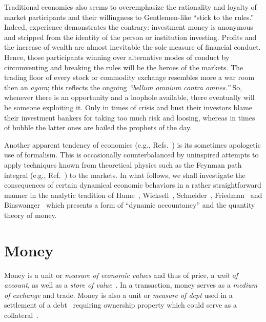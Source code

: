 \documentclass[aps,rmp,preprint,amsfonts,showpacs,showkeys]{revtex4}
\begin{document}
Traditional economics also seems to overemphasize the rationality and loyalty of market participants
and their willingness to Gentlemen-like ``stick to the rules.''
Indeed, experience demonstrates the contrary:
investment money is anonymous and stripped from the identity of the person or institution investing.
Profits and the increase of wealth are almost inevitable the sole measure of financial conduct.
Hence, those participants winning over alternative modes of conduct by circumventing and
breaking the rules will be the heroes of the markets.
The trading floor of every stock or commodity exchange resembles more a war room then an {\it agora};
this reflects the ongoing {\it ``bellum omnium contra omnes.''}
So, whenever there is an opportunity and a loophole available, there eventually will be someone exploiting it.
Only in times of crisis and bust their investors blame their investment bankers for taking too much risk and loosing,
whereas in times of bubble the latter ones are hailed the prophets of the day.


Another apparent tendency of economics (e.g., Refs.~\cite{1948-Samuelson,Begg}) is its sometimes apologetic use of formalism.
This is occasionally counterbalanced by uninspired attempts to apply techniques known from theoretical physics
such as the Feynman path integral (e.g., Ref.~\cite{Baaquie}) to the markets.
In what follows,
we shall investigate the consequences of certain dynamical economic behaviors
in a rather straightforward manner in the analytic tradition of
Hume~\cite{Hume-1742},
Wicksell~\cite{Wicksell-geld,Wicksell-1907},
Schneider~\cite{schneider-VWLIII},
Friedman~\cite{Friedman-2008}
and Binswanger~\cite{2006-Binswanger} which presents
 a form of ``dynamic accountancy'' and the quantity theory of money.

\section{Money}

Money is a unit or {\em measure of economic values} and thus of price,
a {\em unit of account}, as well as a {\em store of value}~\cite{1948-Samuelson,Begg}.
In a transaction, money serves as a {\em medium of exchange} and trade.
Money is also a unit or {\em measure of dept} used in a settlement of a debt~\cite{Wicksell-geld,schneider-VWLIII}
requiring ownership property which could serve as a collateral~\cite{2002-Heinsohn-Steiger}.
\end{document}

